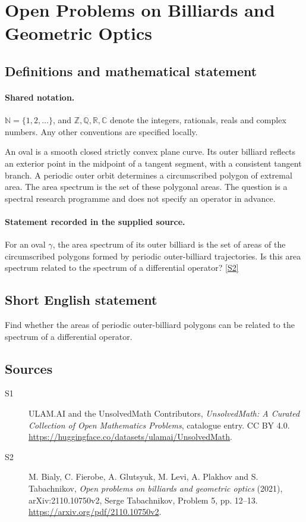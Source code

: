 \documentclass[11pt]{article}
\newcommand{\sref}[2]{\hyperlink{source:#1:#2}{[S#2]}}
\begin{document}
\section{Open Problems on Billiards and Geometric Optics}\label{statement}

\subsection{Definitions and mathematical statement}

\paragraph{Shared notation.}$\mathbb N=\{1,2,\ldots\}$, and $\mathbb Z,\mathbb Q,\mathbb R,\mathbb C$ denote the integers, rationals, reals and complex numbers. Any other conventions are specified locally.


An oval is a smooth closed strictly convex plane curve. Its outer billiard reflects an exterior point in the midpoint of a tangent segment, with a consistent tangent branch. A periodic outer orbit determines a circumscribed polygon of extremal area. The area spectrum is the set of these polygonal areas. The question is a spectral research programme and does not specify an operator in advance.
\paragraph{Statement recorded in the supplied source.}
For an oval $\gamma$, the area spectrum of its outer billiard is the set of areas of the circumscribed polygons formed by periodic outer-billiard trajectories. Is this area spectrum related to the spectrum of a differential operator? \sref{statement}{2}
\subsection{Short English statement}
Find whether the areas of periodic outer-billiard polygons can be related to the spectrum of a differential operator.
\subsection{Sources}
\begin{description}
\item[\hypertarget{source:statement:1}{S1}] ULAM.AI and the UnsolvedMath Contributors, \emph{UnsolvedMath: A Curated Collection of Open Mathematics Problems}, catalogue entry. CC BY 4.0. \url{https://huggingface.co/datasets/ulamai/UnsolvedMath}.
\item[\hypertarget{source:statement:2}{S2}] M. Bialy, C. Fierobe, A. Glutsyuk, M. Levi, A. Plakhov and S. Tabachnikov, \emph{Open problems on billiards and geometric optics} (2021), arXiv:2110.10750v2, Serge Tabachnikov, Problem 5, pp. 12--13. \url{https://arxiv.org/pdf/2110.10750v2}.
\end{description}
\label{end:statement}
\end{document}
